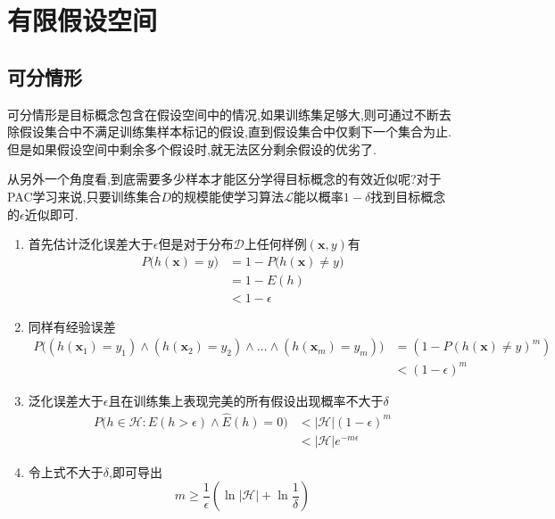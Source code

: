 \section{有限假设空间}

\subsection{可分情形}

可分情形是目标概念包含在假设空间中的情况,如果训练集足够大,则可通过不断去除假设集合中不满足训练集样本标记的假设,直到假设集合中仅剩下一个集合为止.但是如果假设空间中剩余多个假设时,就无法区分剩余假设的优劣了.

从另外一个角度看,到底需要多少样本才能区分学得目标概念的有效近似呢?对于PAC学习来说,只要训练集合$D$的规模能使学习算法$\mathcal L$能以概率$1-\delta$找到目标概念的$\epsilon$近似即可.

\begin{enumerate}
\item 首先估计泛化误差大于$\epsilon$但是对于分布$\mathcal D$上任何样例$(\mathbf x, y)$有 
\begin{equation}
\begin{split}P\Big(h(\mathbf x)=y\Big)&=1-P\Big(h(\mathbf x)\ne y\Big) \\&=1-E(h)\\&<1-\epsilon\end{split}
\end{equation}
\item 同样有经验误差 
\begin{equation}
\begin{split}P\Big((h(\mathbf x_1)=y_1)\land(h(\mathbf x_2)=y_2)\land\dots\land(h(\mathbf x_m)=y_m)\Big)&=(1-P(h(\mathbf x)\ne y)^m)\\&<(1-\epsilon)^m\end{split}
\end{equation}
\item 泛化误差大于$\epsilon$且在训练集上表现完美的所有假设出现概率不大于$\delta$ 
\begin{equation}
\begin{split}P\Big(h\in\mathcal H:E(h>\epsilon)\land\widehat E(h)=0\Big)&<|\mathcal H|(1-\epsilon)^m\\&<|\mathcal H|e^{-m\epsilon}\end{split}
\end{equation}
\item 令上式不大于$\delta$,即可导出
\begin{equation}
m\ge \frac{1}{\epsilon}(\ln|\mathcal H|+\ln\frac{1}{\delta})
\end{equation}
\end{enumerate}

